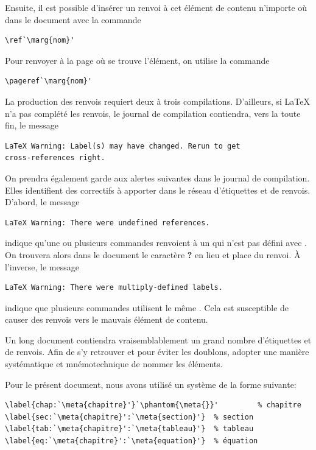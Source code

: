 Ensuite, il est possible d'insérer un renvoi à cet élément de contenu
n'importe où dans le document avec la commande
\begin{lstlisting}
\ref`\marg{nom}'
\end{lstlisting}
Pour renvoyer à la page où se trouve l'élément, on utilise la commande
\begin{lstlisting}
\pageref`\marg{nom}'
\end{lstlisting}

La production des renvois requiert deux à trois compilations.
D'ailleurs, si {\LaTeX} n'a pas complété les renvois, le journal de
compilation contiendra, vers la toute fin, le message
\begin{verbatim}
LaTeX Warning: Label(s) may have changed. Rerun to get
cross-references right.
\end{verbatim}

On prendra également garde aux alertes suivantes dans le journal de
compilation. Elles identifient des correctifs à apporter dans le
réseau d'étiquettes et de renvois. D'abord, le message
\begin{verbatim}
LaTeX Warning: There were undefined references.
\end{verbatim}
indique qu'une ou plusieurs commandes \cmd{\ref} renvoient à un
 qui n'est pas défini avec \cmd{\label}. On trouvera alors
dans le document le caractère \textbf{?} en lieu et place du renvoi. À
l'inverse, le message
\begin{verbatim}
LaTeX Warning: There were multiply-defined labels.
\end{verbatim}
indique que plusieurs commandes \cmdprint{\label} utilisent le même
. Cela est susceptible de causer des renvois vers le mauvais
élément de contenu.

\begin{conseil}
  Un long document contiendra vraisemblablement un grand nombre
  d'étiquettes et de renvois. Afin de s'y retrouver et pour éviter les
  doublons, adopter une manière systématique et mnémotechnique de
  nommer les éléments.

  Pour le présent document, nous avons utilisé un système de la forme
  suivante:
\begin{lstlisting}
\label{chap:`\meta{chapitre}'}`\phantom{\meta{}}'         % chapitre
\label{sec:`\meta{chapitre}':`\meta{section}'}  % section
\label{tab:`\meta{chapitre}':`\meta{tableau}'}  % tableau
\label{eq:`\meta{chapitre}':`\meta{equation}'}  % équation
\end{lstlisting}
\end{conseil}

